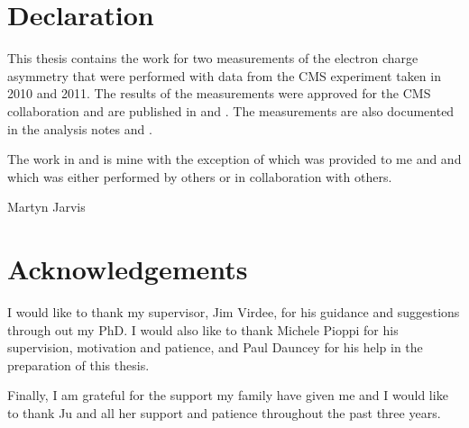 \setcounter{page}{4}
\cleardoublepage

\chapter*{Declaration}
\begin{adjustwidth}{50pt}{50pt}

This thesis contains the work for two measurements of the electron charge
asymmetry that were performed with data from the CMS experiment taken in 2010
and 2011. The results of the measurements were approved for the CMS
collaboration and are published in \cite{asym36} and \cite{asym840}. The
measurements are also documented in the analysis notes
\cite{bendavid2011electron} and \cite{baisini2010electron}. 

The work in  and  is mine
with the exception of  which was provided to me and
 and  which was
either performed by others or in collaboration with others.

  \vspace*{1cm}
  \begin{flushright}
    Martyn Jarvis
  \end{flushright}
\end{adjustwidth}
\clearpage

\chapter*{Acknowledgements}
\begin{adjustwidth}{50pt}{50pt}
I would like to thank my supervisor, Jim Virdee, for his guidance and
suggestions through out my PhD.  I would also like to thank Michele Pioppi for
his supervision, motivation and patience, and Paul Dauncey for his
help in the preparation of this thesis.

Finally, I am grateful for the support my family have given me and I would like to thank
Ju and all her support and patience throughout the past three years.
\end{adjustwidth}
\clearpage


\listoftodos

\tableofcontents

\listoffigures
\listoftables
